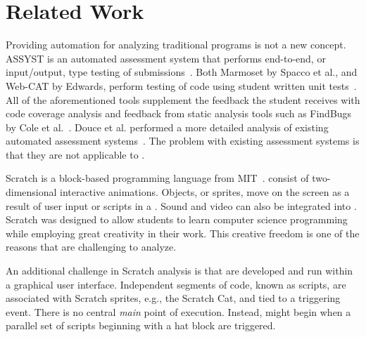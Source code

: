 \section{Related Work}

Providing automation for analyzing traditional programs is not a new concept.
ASSYST is an automated assessment system that performs end-to-end, or
input/output, type testing of
submissions~\cite{Jackson:1997:GSP:268084.268210}. Both Marmoset by Spacco et
al., and Web-CAT by Edwards, perform testing of code using student written unit
tests~\cite{Spacco:2006:EMD:1140124.1140131,
  Edwards:2003:RCS:949344.949390}. All of the aforementioned tools supplement
the feedback the student receives with code coverage analysis and feedback from
static analysis tools such as FindBugs by Cole et
al.~\cite{Cole:2006:IYS:1176617.1176667}. Douce et al. performed a more
detailed analysis of existing automated assessment
systems~\cite{Douce:2005:ATA:1163405.1163409}.  The problem with existing
assessment systems is that they are not applicable to .

Scratch is a block-based programming language from
MIT~\cite{Maloney:2010:SPL:1868358.1868363}.   consist of
two-dimensional interactive animations.  Objects, or sprites, move on the
screen as a result of user input or scripts in a \sprogram{}.  Sound and video
can also be integrated into .  Scratch was designed to allow
students to learn computer science programming while employing great creativity
in their work.  This creative freedom is one of the reasons that 
are challenging to analyze.

An additional challenge in Scratch analysis is that  are developed
and run within a graphical user interface.  Independent segments of code, known
as scripts, are associated with Scratch sprites, e.g., the Scratch Cat, and
tied to a triggering event.  There is no central \emph{main} point of
execution.  Instead,  might begin when a parallel set of scripts
beginning with a \greenflag{} hat block are triggered.

